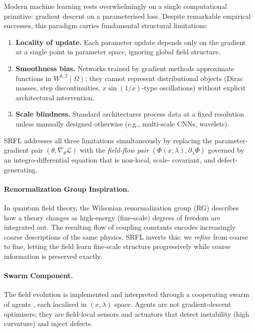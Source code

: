 \documentclass[12pt,a4paper]{article}
\theoremstyle{plain}
\theoremstyle{definition}
\theoremstyle{remark}
\newcommand{\cL}{\mathcal{L}}
\begin{document}
Modern machine learning rests overwhelmingly on a single computational
primitive: gradient descent on a parameterised loss.  Despite remarkable
empirical successes, this paradigm carries fundamental structural
limitations:
\begin{enumerate}[label=(\roman*)]
  \item \textbf{Locality of update.} Each parameter update depends only
    on the gradient at a single point in parameter space, ignoring
    global field structure.
  \item \textbf{Smoothness bias.} Networks trained by gradient methods
    approximate functions in $W^{k,2}(\Omega)$; they cannot represent
    distributional objects (Dirac masses, step discontinuities,
    $x\sin(1/x)$-type oscillations) without explicit architectural
    intervention.
  \item \textbf{Scale blindness.} Standard architectures process data
    at a fixed resolution unless manually designed otherwise (e.g.,
    multi-scale CNNs, wavelets).
\end{enumerate}

SRFL addresses all three limitations simultaneously by replacing the
parameter-gradient pair $(\theta, \nabla_\theta \cL)$ with the
\emph{field-flow pair} $(\Phi(x,\lambda), \partial_\lambda \Phi)$
governed by an integro-differential equation that is non-local, scale-
covariant, and defect-generating.

\paragraph{Renormalization Group Inspiration.}
In quantum field theory, the Wilsonian renormalization group (RG)
\cite{wilson1974renormalization} describes how a theory changes as
high-energy (fine-scale) degrees of freedom are integrated out.  The
resulting flow of coupling constants encodes increasingly coarse
descriptions of the same physics.  SRFL inverts this: we \emph{refine}
from coarse to fine, letting the field learn fine-scale structure
progressively while coarse information is preserved exactly.

\paragraph{Swarm Component.}
The field evolution is implemented and interpreted through a cooperating
swarm of agents \cite{dorigo2006ant,kennedy1995particle}, each localised
in $(x,\lambda)$ space.  Agents are not gradient-descent optimisers;
they are field-local sensors and actuators that detect instability
(high curvature) and inject defects.
\end{document}
